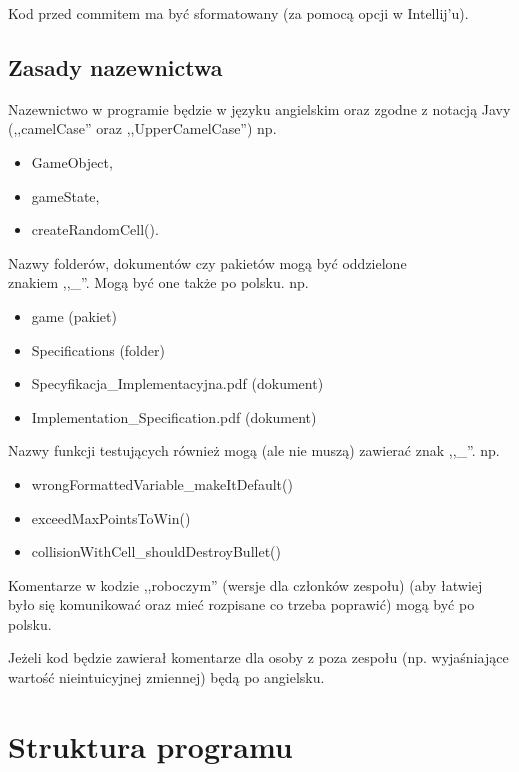 \documentclass{article}
\begin{document}
\par Kod przed commitem ma być sformatowany (za pomocą opcji w Intellij'u).

\subsection{Zasady nazewnictwa} 

\par Nazewnictwo w programie będzie w języku angielskim oraz zgodne z notacją Javy (,,camelCase'' oraz ,,UpperCamelCase'')
np. 
\begin{itemize}
    \item GameObject, 
    \item gameState,
    \item createRandomCell().
\end{itemize}

Nazwy folderów, dokumentów czy pakietów mogą być oddzielone \\ znakiem ,,\_''. Mogą być one także po polsku.
np. 
\begin{itemize}
    \item game (pakiet)
    \item Specifications (folder)
    \item Specyfikacja\_Implementacyjna.pdf (dokument)
    \item Implementation\_Specification.pdf (dokument)
\end{itemize}

Nazwy funkcji testujących również mogą (ale nie muszą) zawierać znak ,,\_''.
np.
\begin{itemize}
    \item wrongFormattedVariable\_makeItDefault()
    \item exceedMaxPointsToWin()
    \item collisionWithCell\_shouldDestroyBullet()
\end{itemize}

\par Komentarze w kodzie ,,roboczym'' (wersje dla członków zespołu) (aby łatwiej było się komunikować oraz mieć rozpisane co trzeba poprawić) mogą być po polsku.
\par Jeżeli kod będzie zawierał komentarze dla osoby z poza zespołu (np. wyjaśniające wartość nieintuicyjnej zmiennej) będą po angielsku.

\clearpage

\section{Struktura programu} 
\end{document}
